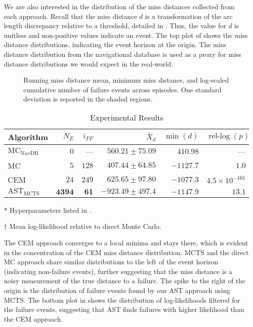 We are also interested in the distribution of the miss distances collected from each approach.
Recall that the miss distance $d$ is a transformation of the arc length discrepancy relative to a threshold, detailed in .
Thus, the value for $d$ is unitless and non-positive values indicate an event.
The top plot of  shows the miss distance distributions, indicating the event horizon at the origin.
The miss distance distribution from the navigational database is used as a proxy for miss distance distributions we would expect in the real-world.
\begin{figure}[t]
\centering
\resizebox{0.55\columnwidth}{!}{}
\caption{Running miss distance mean, minimum miss distance, and log-scaled cumulative number of failure events across episodes. One standard deviation is reported in the shaded regions.}
\label{fig:episodes}
\end{figure}
%
\begin{table}[!hb]
  \small
  \centering
  \caption{\label{tab:ast_results} Experimental Results}
  \begin{threeparttable}
  \begin{tabular}{@{}lrrrrr@{}}
    \toprule
    Algorithm\tnote{*} & $N_E$ & $i_{FF}$ & $\bar{X}_d$ & $\min(d)$ & $\operatorname{rel-log}(p)$\tnote{$\dagger$}\\
    \midrule
    $\text{MC}_\text{NavDB}$ & $0$          & ---        & $560.21 \pm75.09$       & $410.98$         & ---\\
    MC                       & $5$          & $128$        & $407.44 \pm64.85$       & $-1127.7$      & $1.0$\\
    CEM                      & $24$         & $249$        & $625.65 \pm97.80$        & $-1077.3$      & $4.5\times 10^{-161}$\\
    $\text{AST}_\text{MCTS}$ & $\bm{4394}$ & $\bm{61}$ & $\bm{-923.49 \pm497.4}$ & $\bm{-1147.9}$ & $\bm{13.1}$\\
    \bottomrule
  \end{tabular}
  \begin{tablenotes}
      \item[*] {Hyperparameters listed in .}
      \item[$\dagger$] {Mean log-likelihood relative to direct Monte Carlo.}
  \end{tablenotes}
  \end{threeparttable}
\end{table}
The CEM approach converges to a local minima and stays there, which is evident in the concentration of the CEM miss distance distribution.
MCTS and the direct MC approach share similar distributions to the left of the event horizon (indicating non-failure events), further suggesting that the miss distance is a noisy measurement of the true distance to a failure.
The spike to the right of the origin is the distribution of failure events found by our AST approach using MCTS.
The bottom plot in  shows the distribution of log-likelihoods filtered for the failure events, suggesting that AST finds failures with higher likelihood than the CEM approach.


